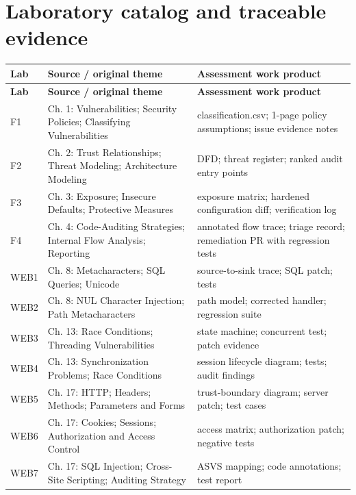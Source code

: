 \documentclass[10pt,letterpaper]{article}
\begin{document}
\section{Laboratory catalog and traceable evidence}
\begingroup\footnotesize\setlength\tabcolsep{3pt}
\begin{longtable}{>{\raggedright\arraybackslash}p{}>{\raggedright\arraybackslash}p{}>{\raggedright\arraybackslash}p{}}\toprule
\textbf{Lab} & \textbf{Source / original theme} & \textbf{Assessment work product}\\\midrule\endfirsthead
\toprule \textbf{Lab} & \textbf{Source / original theme} & \textbf{Assessment work product}\\\midrule\endhead
F1 & Ch. 1: Vulnerabilities; Security Policies; Classifying Vulnerabilities & classification.csv; 1-page policy assumptions; issue evidence notes\\\midrule
F2 & Ch. 2: Trust Relationships; Threat Modeling; Architecture Modeling & DFD; threat register; ranked audit entry points\\\midrule
F3 & Ch. 3: Exposure; Insecure Defaults; Protective Measures & exposure matrix; hardened configuration diff; verification log\\\midrule
F4 & Ch. 4: Code-Auditing Strategies; Internal Flow Analysis; Reporting & annotated flow trace; triage record; remediation PR with regression tests\\\midrule
WEB1 & Ch. 8: Metacharacters; SQL Queries; Unicode & source-to-sink trace; SQL patch; tests\\\midrule
WEB2 & Ch. 8: NUL Character Injection; Path Metacharacters & path model; corrected handler; regression suite\\\midrule
WEB3 & Ch. 13: Race Conditions; Threading Vulnerabilities & state machine; concurrent test; patch evidence\\\midrule
WEB4 & Ch. 13: Synchronization Problems; Race Conditions & session lifecycle diagram; tests; audit findings\\\midrule
WEB5 & Ch. 17: HTTP; Headers; Methods; Parameters and Forms & trust-boundary diagram; server patch; test cases\\\midrule
WEB6 & Ch. 17: Cookies; Sessions; Authorization and Access Control & access matrix; authorization patch; negative tests\\\midrule
WEB7 & Ch. 17: SQL Injection; Cross-Site Scripting; Auditing Strategy & ASVS mapping; code annotations; test report\\\midrule

\end{longtable}
\end{document}
